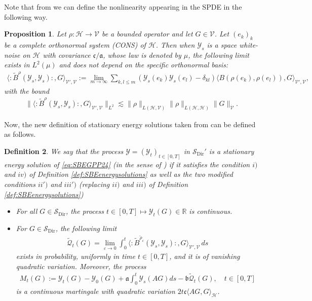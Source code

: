 \documentclass[a4paper, reqno, 12pt]{amsart}
\theoremstyle{plain}
\newtheorem{definition}{Definition}[section]
\newtheorem{prop}[definition]{Proposition}
\theoremstyle{definition}
\newcommand{\Sdir}{\mathcal{S}_{\text{Dir}}}
\begin{document}
Note that from \cite[Lemma 2.4]{GPP24} we can define the nonlinearity appearing in the SPDE in the following way. 
\begin{prop} 
\label{prop:Burgersapprox}
Let $\rho:\mathcal H\to \mathcal V$ be a bounded operator and let $G\in \mathcal V$. Let $(e_k)_k$ be a complete orthonormal system (CONS) of $\mathcal H$. Then when $\mathcal Y_s$ is a space white-noise on $\mathcal H$ with covariance $\mathfrak c/ \mathfrak a$, whose law is denoted by $\mu$, the following limit exists in $L^2(\mu)$ and does not depend on the specific orthonormal basis: 
    \begin{align}
    \label{eq:defBtilderho}
        \langle :\!\tilde{B}^{\rho}(\mathcal{Y}_s,\mathcal{Y}_s)\!:, G\rangle_{\mathcal V',\mathcal V} :=  \lim_{m\to\infty} \sum_{k,l\leq m} (\mathcal{Y}_s(e_k)\mathcal{Y}_s(e_l) - \delta_{kl})\langle B(\rho(e_k),\rho(e_l)),G\rangle_{\mathcal V',\mathcal V},
    \end{align}
    with the bound
    \begin{align} \label{eq:Btildebound}
        \| \langle :\!\tilde{B}^{\rho}(\mathcal{Y}_s,\mathcal{Y}_s)\!:, G\rangle_{\mathcal V',\mathcal V} \|_{L^2}  \lesssim \|\rho\|_{L(\mathcal H,\mathcal V)}\|\rho\|_{L(\mathcal H,\mathcal H)} \|G\|_{\dot{\mathcal V}}.
    \end{align}
\end{prop}
Now, the new definition of stationary energy solutions taken from \cite[Lemma 2.19]{GPP24} can be defined as follows. 
\begin{definition} 
\label{def:otherSBEenergysol}
We say that the process $\mathcal Y = (\mathcal{Y}_t)_{t\in[0,T]}$ in $\Sdir'$ is a stationary energy solution of \eqref{eq:SBEGPP24} (in the sense of \cite{GPP24}) if it satisfies the condition $i)$ and $iv)$ of Definition \ref{def:SBEenergysolutions} as well as the two modified conditions $ii')$ and $iii')$ (replacing $ii)$ and $iii)$ of Definition \ref{def:SBEenergysolutions})
     \begin{itemize}
         \item[ii')] For all $G\in \Sdir$, the process $t \in [0,T] \mapsto \mathcal{Y}_t(G) \in \mathbb R $ is continuous.
         \item[iii')] For $G\in\Sdir$, the following limit  
    \begin{align}
    \label{eq:BSBE}
        \tilde{\mathcal Q}_t(G) = \lim_{\varepsilon\to 0} \int_0^t \langle :\!\tilde{B}^{\check \rho_{\varepsilon}}(\mathcal{Y}_s,\mathcal{Y}_s)\!:, G\rangle_{\mathcal V',\mathcal V} \, ds
    \end{align}
    exists  in probability, uniformly in time $t \in [0,T]$, and it is of vanishing quadratic variation. Moreover, the process 
    \begin{align*}
        M_t(G) :=  \mathcal{Y}_t(G) - \mathcal{Y}_0(G) + \mathfrak a\int_0^t\mathcal{Y}_s (AG) ds - \mathfrak b \tilde{\mathcal{Q}}_t(G), \quad t\in[0,T]
    \end{align*} 
    is a continuous martingale with quadratic variation $2t\mathfrak c\langle AG,G\rangle_{\mathcal H}$.
     \end{itemize}
\end{definition}
\end{document}
